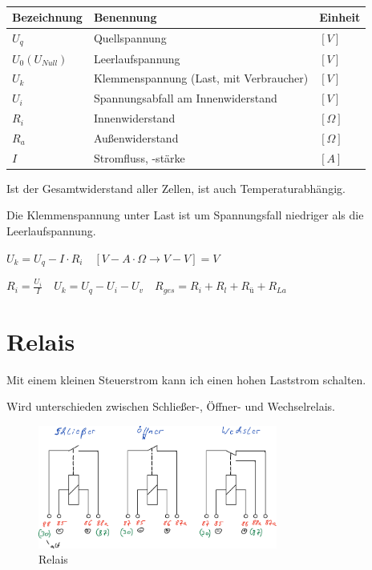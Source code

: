 \begin{table}[!ht]%
\centering 
	\caption{}%
\begin{tabular}{@{}lll@{}}
\hline
\textbf{Bezeichnung} & \textbf{Benennung} & \textbf{Einheit} \\
\hline
$U_q$ & Quellspannung & $[V]$ \\
$U_0 (U_{Null})$ & Leerlaufspannung & $[V]$ \\
$U_k$ & Klemmenspannung (Last, mit Verbraucher) & $[V]$ \\
$U_i$ & Spannungsabfall am Innenwiderstand & $[V]$ \\
$R_i$ & Innenwiderstand & $[\Omega]$ \\
$R_a$ & Außenwiderstand & $[\Omega]$ \\
$I$ & Stromfluss, -stärke & $[A]$ \\
\hline
\end{tabular} 
\end{table}

Ist der Gesamtwiderstand aller Zellen, ist auch Temperaturabhängig.

Die Klemmenspannung unter Last ist um Spannungsfall niedriger als die
Leerlaufspannung.

$\boxed{U_k = U_q - I \cdot R_i} \quad [V - A \cdot \Omega \to V - V] = V$

$\boxed{R_i = \frac{U_i}{I}} \quad \boxed{U_k = U_q - U_i - U_v} \quad \boxed{R_{ges} = R_i + R_l + R_\text{ü} + R_{La}}$

\newpage

\section{Relais}\label{relais}

Mit einem kleinen Steuerstrom kann ich einen hohen Laststrom schalten.

Wird unterschieden zwischen Schließer-, Öffner- und Wechselrelais.

\begin{figure}[!ht]%
\centering
\includegraphics[width=0.7\textwidth]{images/Skizze/08_Relais_Skizze.pdf}
\caption{Relais}
\end{figure}

